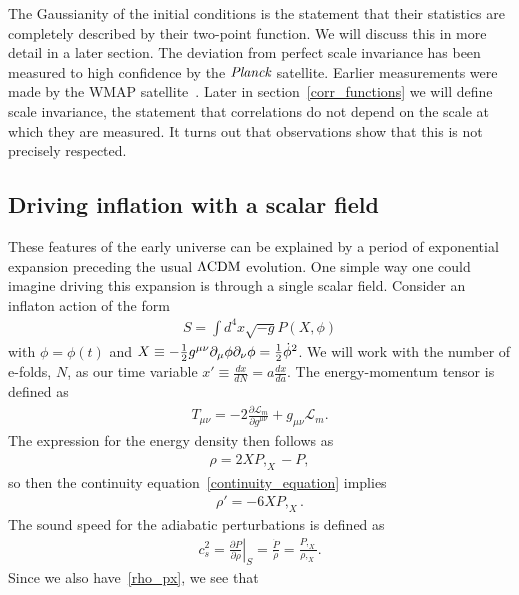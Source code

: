     The Gaussianity of the initial conditions is the statement that their statistics are completely described by
    their two-point function. We will discuss this in more detail in a later section.
    The deviation from perfect scale invariance has been measured to high confidence by the $\textit{Planck}$
    satellite.
    Earlier measurements were made by the WMAP satellite~\cite{Senatore_wmap_2009}.
    Later in section~\ref{corr_functions} we will define scale invariance,
    the statement that correlations do not depend on the scale at which they are measured.
    It turns out that observations show that this is not precisely respected.


    \subsection{Driving inflation with a scalar field}
    These features of the early universe can be explained by a period of exponential expansion
    preceding the usual $\Lambda\text{CDM}$ evolution.
    One simple way one could imagine driving this expansion is through a single
    scalar field.
Consider an inflaton action of the form
\begin{align}
S = \int d^4x \sqrt{-g}P(X,\phi)
\end{align}
with $\phi=\phi(t)$ and $X\equiv-\frac{1}{2}g^{\mu\nu}\partial_\mu\phi\partial_\nu\phi=\frac{1}{2}\dot{\phi}^2$.
We will work with the number of e-folds, $N$, as our time variable
$x'\equiv\frac{dx}{dN}=a\frac{dx}{da}$.
The energy-momentum tensor is defined as
\begin{align}\label{gr_energy}
    T_{\mu\nu} = -2\frac{\partial\mathcal{L}_m}{\partial g^{\mu\nu}}+g_{\mu\nu}\mathcal{L}_m.
\end{align}
The expression for the energy density then follows as
\begin{align}\label{rho_px}
    \rho = 2XP,_X-P,
\end{align}
so then the continuity equation~\eqref{continuity_equation} implies
\begin{align}\label{rho_deriv}
    \rho' = -6XP,_X.
\end{align}
    The sound speed for the adiabatic perturbations is defined as~\cite{Christopherson_2009}
    \begin{align}\label{sound_speed_definition}
        c_s^2 = \left. \frac{\partial P}{\partial \rho} \right|_S = \frac{\dot{P}}{\dot{\rho}}
        = \frac{P,_X}{\rho,_X}.
    \end{align}
    Since we also have~\eqref{rho_px}, we see that
